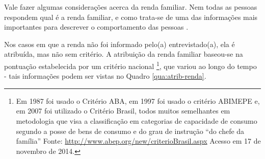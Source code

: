 



Vale fazer algumas considerações acerca da renda familiar. Nem todas as pessoas respondem qual é a renda familiar, e como trata-se de uma das informações mais importantes para descrever o comportamento das pessoas \cite{SHEARMUR2006}. 

Nos casos em que a renda não foi informado pelo(a) entrevistado(a), ela é atribuída, mas não sem critério. A atribuição da renda familiar baseou-se na pontuação estabelecida por um critério nacional%
\footnote{Em 1987 foi usado o Critério ABA, em 1997 foi usado o critério ABIMEPE e, em 2007 foi utilizado o Critério Brasil, todos muitos semelhantes em metodologia que visa a classificação em categorias de capacidade de consumo segundo a posse de bens de consumo e do grau de instrução ``do chefe da família''
Fonte: \url{http://www.abep.org/new/criterioBrasil.aspx} Acesso em 17 de novembro de 2014.},
que variou ao longo do tempo - tais informações podem ser vistas no Quadro \ref{qua:atrib-renda}.

